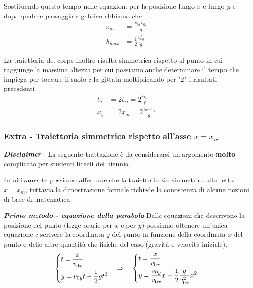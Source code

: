 \documentclass{article}
\begin{document}
Sostituendo questo tempo nelle equazioni per la posizione lungo $x$ e lungo $y$ e dopo qualche passaggio algebrico abbiamo che
\begin{align}
  x_m &= \frac{v_{0x}v_{0y}}{g} \\
  h_{max} &= \frac{1}{2}\frac{v_{0y}^2}{g}
\end{align}

La traiettoria del corpo inoltre risulta simmetrica rispetto al punto in cui raggiunge la massima altezza per cui possiamo anche determinare il tempo che impiega per toccare il suolo e la gittata moltiplicando per "$2$" i risultati precedenti
\begin{align}
  t_c &= 2t_m = 2\frac{v_{0y}}{g} \\
  x_g &= 2x_m = 2\frac{v_{0x}v_{0y}}{g}
\end{align}

\subsubsection{Extra - Traiettoria simmetrica rispetto all'asse $x=x_m$}
\textbf{\textit{Disclaimer}} - La seguente trattazione è da considerarsi un argomento \textbf{molto} complicato per studenti liceali del biennio.
\vspace{10pt}

Intuitivamente possiamo affermare che la traiettoria sia simmetrica alla retta $x=x_m$, tuttavia la dimostrazione formale richiede la conoscenza di alcune nozioni di base di matematica.

\textbf{\textit{Primo metodo - equazione della parabola}}
\newline
Dalle equazioni che descrivono la posizione del punto (legge orarie per $x$ e per $y$) possiamo ottenere un'unica equazione e scrivere la coordinata $y$ del punto in funzione della coordinata $x$ del punto e delle altre quantità che fisiche del caso (gravità e velocità iniziale).
\begin{equation}
  \begin{dcases}
    t = \frac{x}{v_{0x}}\\
    y = v_{0y} t - \frac{1}{2}gt^2
  \end{dcases}
  \quad\Rightarrow\quad
  \begin{dcases}
    t = \frac{x}{v_{0x}}\\
    y = \frac{v_{0y}}{v_{0x}} x - \frac{1}{2}\frac{g}{v_{0x}^2}x^2
  \end{dcases}
\end{equation}
\end{document}
